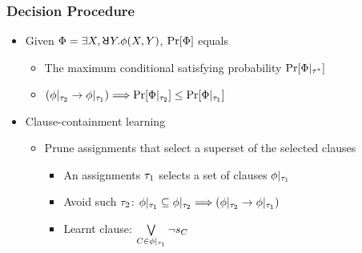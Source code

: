 \begin{frame}
    \frametitle{Decision Procedure}
    \begin{itemize}
        \item Given $\Qf=\exists X,\random{} Y.\pf(X,Y)$, $\Pr[\Phi]$ equals
              \begin{itemize}
                  \item The maximum conditional satisfying probability $\Pr[\Phi|_{\tau^*}]$
                  \item $(\phi|_{\tau_2}\rightarrow\phi|_{\tau_1})\Longrightarrow\Pr[\Phi|_{\tau_2}]\leq\Pr[\Phi|_{\tau_1}]$
              \end{itemize}
              \pause
        \item Clause-containment learning
              \begin{itemize}
                  \item Prune assignments that select a superset of the selected clauses
                        \begin{itemize}
                            \item An assignments $\tau_1$ selects a set of clauses $\phi|_{\tau_1}$
                            \item Avoid such $\tau_2$: $\phi|_{\tau_1}\subseteq\phi|_{\tau_2}\Longrightarrow(\phi|_{\tau_2}\rightarrow\phi|_{\tau_1})$
                            \item Learnt clause: $\bigvee\limits_{C\in\phi|_{\tau_1}}\lnot s_{C}$
                        \end{itemize}
              \end{itemize}
    \end{itemize}
\end{frame}

